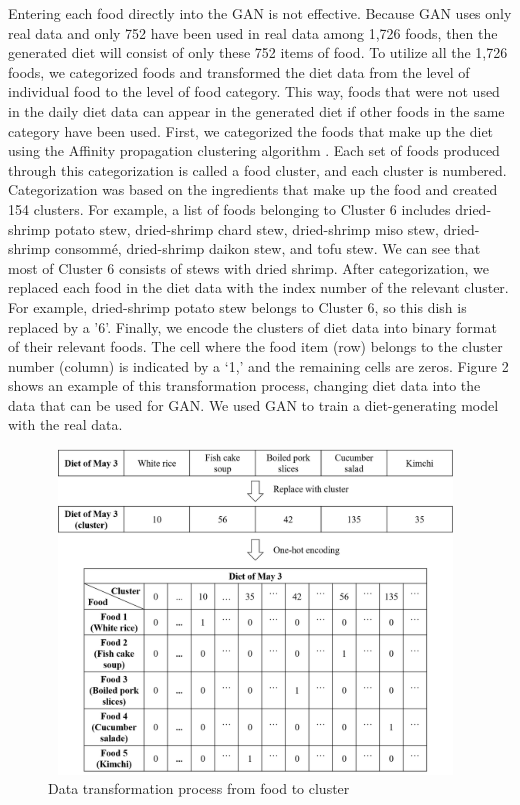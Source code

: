 \documentclass{article}
\begin{document}
Entering each food directly into the GAN is not effective. Because GAN uses only real data and only 752 have been used in real data among 1,726 foods, then the generated diet will consist of only these 752 items of food. To utilize all the 1,726 foods, we categorized foods and transformed the diet data from the level of individual food to the level of food category. This way, foods that were not used in the daily diet data can appear in the generated diet if other foods in the same category have been used. 
First, we categorized the foods that make up the diet using the Affinity propagation clustering algorithm \cite{frey2007clustering}. Each set of foods produced through this categorization is called a food cluster, and each cluster is numbered. 
Categorization was based on the ingredients that make up the food and created 154 clusters. For example, a list of foods belonging to Cluster 6 includes dried-shrimp potato stew, dried-shrimp chard stew, dried-shrimp miso stew, dried-shrimp consommé, dried-shrimp daikon stew, and tofu stew. We can see that most of Cluster 6 consists of stews with dried shrimp. After categorization, we replaced each food in the diet data with the index number of the relevant cluster. For example, dried-shrimp potato stew belongs to Cluster 6, so this dish is replaced by a ’6’. Finally, we encode the clusters of diet data into binary format of their relevant foods. The cell where the food item (row) belongs to the cluster number (column) is indicated by a ‘1,’ and the remaining cells are zeros.
Figure 2 shows an example of this transformation process, changing diet data into the data that can be used for GAN. We used GAN to train a diet-generating model with the real data.

\begin{figure}[!ht]
    \centering
    \includegraphics[width = 11cm, height = 8.62cm]{images/menu_transform.png}
    \caption{Data transformation process from food to cluster}
    \label{fig:GAN_transform}
\end{figure} 
\end{document}
